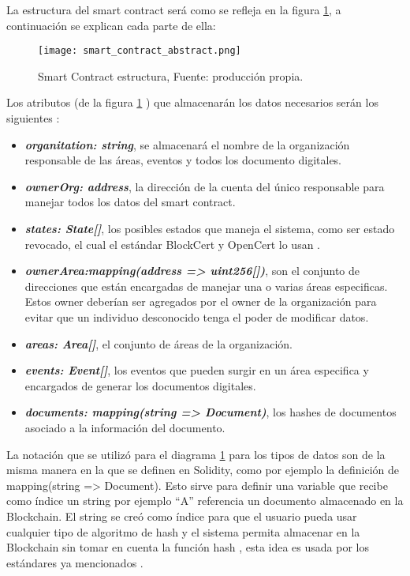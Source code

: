   La estructura del smart contract será como se refleja en la figura \ref{img:smart_contract_structure}, a continuación se explican cada parte de ella:

  
\begin{figure}[hbt!]
    \centering
    {\texttt{[image: smart\_contract\_abstract.png]}}
    \caption{Smart Contract estructura, Fuente: producción propia.}
    \label{img:smart_contract_structure}
  \end{figure}
Los atributos (de la figura \ref{img:smart_contract_structure} ) que almacenarán los datos necesarios serán los siguientes :
  \begin{itemize}
    \item \textit{\textbf{ organitation: string}}, se almacenará el nombre de la organización responsable de las áreas, eventos y todos los documento digitales.
    \item \textit{\textbf{ownerOrg: address}}, la dirección de la cuenta del único responsable para manejar todos los datos del smart contract.
    \item \textit{\textbf{states: State[]}}, los posibles estados que maneja el sistema, como ser estado revocado, el cual el estándar BlockCert y OpenCert lo usan \cite[]{blockcerts_faq_nodate,opencerts_gestion_nodate}.
    \item \textit{\textbf{ownerArea:mapping(address => uint256[])}}, son el conjunto de direcciones que están encargadas de manejar una o varias áreas especificas. Estos owner deberían ser agregados por el owner de la organización para evitar que un individuo desconocido tenga el poder de modificar datos.
    \item \textit{\textbf{areas: Area[]}}, el conjunto de áreas de la organización.
    \item \textit{\textbf{events: Event[]}}, los eventos que pueden surgir en un área especifica y encargados de generar los documentos digitales.
    \item \textit{\textbf{documents: mapping(string => Document)}}, los hashes de documentos asociado a la información del documento.
    \end{itemize}

    La notación que se utilizó para el diagrama \ref{img:smart_contract_structure} para los tipos de datos son de la misma manera
    en la que se definen en Solidity,
    como por ejemplo la definición de mapping(string => Document). Esto sirve para definir  una variable  que recibe como
    índice un string por ejemplo “A”  referencia un documento almacenado en la Blockchain. El string se creó como índice para 
    que el usuario pueda usar cualquier tipo de algoritmo de hash y el sistema permita almacenar en la  Blockchain sin tomar en cuenta la función hash
   , esta idea es usada por los estándares ya mencionados \cite[]{opencerts_gestion_nodate,blockcerts_introduction_nodate,blockcerts_faq_nodate}. 

